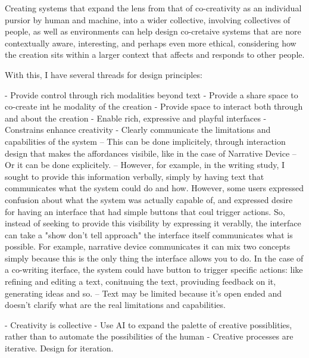 Creating systems that expand the lens from that of co-creativity as an individual pursior by human and machine, into a wider collective, involving collectives of people, as well as environments can help design co-cretaive systems that are nore contextually aware, interesting, and perhaps even more ethical, considering how the creation sits within a larger context that affects and responds to other people. 

With this, I have several threads for design principles: 

- Provide control through rich modalities beyond text
- Provide a share space to co-create int he modality of the creation
- Provide space to interact both through and about the creation
- Enable rich, expressive and playful interfaces
- Constrains enhance creativity
- Clearly communicate the limitations and capabilities of the system
   -- This can be done implicitely, through interaction design that makes the affordances visibile, like in the case of Narrative Device
  -- Or it can be done explicitely. 
  -- However, for example, in the writing study, I sought to provide this information verbally, simply by having text that communicates what the system could do and how. However, some users expressed confusion about what the system was actually capable of, and expressed desire for having an interface that had simple buttons that coul trigger actions. So, instead of seeking to provide this visibility by expressing it verablly, the interface can take a "show don't tell approach" the interface itself communicates what is possible. For example, narrative device communicates it can mix two concepts simply because this is the only thing the interface allows you to do. In the case of a co-writing iterface, the system could have button to trigger specific actions: like refining and editing a text, conitnuing the text, proviuding feedback on it, generating ideas and so. 
-- Text may be limited because it's open ended and doesn't clarify what are the real limitations and capabilities. 


- Creativity is collective
- Use AI to expand the palette of creative possiblities, rather than to automate the possibilities of the human
- Creative processes are iterative. Design for iteration. 
